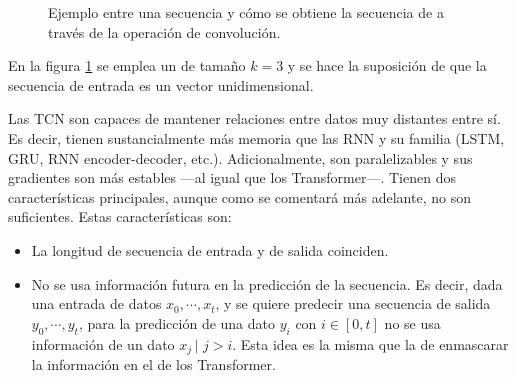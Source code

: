 \begin{figure}[H]
    \caption{Ejemplo entre una secuencia  y cómo se obtiene la secuencia de  a través de la operación de convolución.}
    \label{convol}
\end{figure}

En la figura \ref{convol} se emplea un  de tamaño $k = 3$ y se hace la suposición de que la secuencia de entrada es un vector unidimensional\fnm.



Las TCN son capaces de mantener relaciones entre datos muy distantes entre sí. Es decir, tienen sustancialmente más memoria que las RNN y su familia (LSTM, GRU, RNN encoder-decoder, etc.). Adicionalmente, son paralelizables y sus gradientes son más estables ---al igual que los Transformer---. Tienen dos características principales, aunque como se comentará más adelante, no son suficientes. Estas características son:
\begin{itemize}
    \item La longitud de secuencia de entrada y de salida coinciden.
    \item No se usa información futura en la predicción de la secuencia. Es decir, dada una entrada de datos $x_0, \cdots, x_t$, y se quiere predecir una secuencia de salida $y_0, \cdots, y_t$, para la predicción de una dato $y_i$ con $i \in [0,t]$ no se usa información de un dato $x_j \hspace{2pt}|\hspace{4pt} j >i$. Esta idea es la misma que la de enmascarar la información en el  de los Transformer.
\end{itemize}

